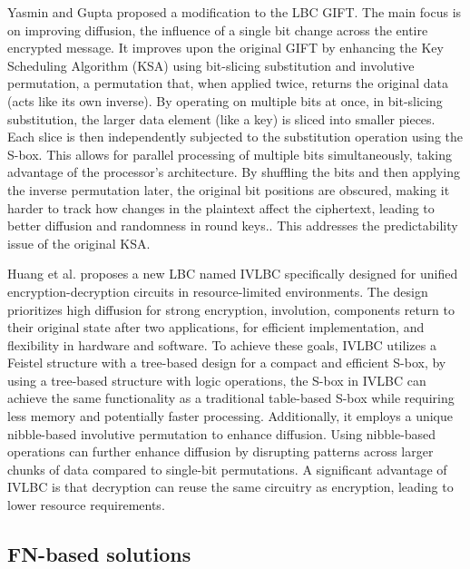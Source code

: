 \documentclass[conference]{IEEEtran}
\begin{document}
Yasmin and Gupta proposed a modification to the LBC GIFT. The main focus is on improving diffusion, the influence of a single bit change across the entire encrypted message. It improves upon the original GIFT by enhancing the Key Scheduling Algorithm (KSA) using bit-slicing substitution and involutive permutation, a permutation that, when applied twice, returns the original data (acts like its own inverse). By operating on multiple bits at once, in bit-slicing substitution, the larger data element (like a key) is sliced into smaller pieces. Each slice is then independently subjected to the substitution operation using the S-box. This allows for parallel processing of multiple bits simultaneously, taking advantage of the processor's architecture. By shuffling the bits and then applying the inverse permutation later, the original bit positions are obscured, making it harder to track how changes in the plaintext affect the ciphertext, leading to better diffusion and randomness in round keys.. This addresses the predictability issue of the original KSA.\cite{GIFT}\cite{yasmin2023modified}

Huang et al. proposes a new LBC named IVLBC specifically designed for unified encryption-decryption circuits in resource-limited environments. The design prioritizes high diffusion for strong encryption, involution, components return to their original state after two applications, for efficient implementation, and flexibility in hardware and software. To achieve these goals, IVLBC utilizes a Feistel structure with a tree-based design for a compact and efficient S-box, by using a tree-based structure with logic operations, the S-box in IVLBC can achieve the same functionality as a traditional table-based S-box while requiring less memory and potentially faster processing. Additionally, it employs a unique nibble-based involutive permutation to enhance diffusion. Using nibble-based operations can further enhance diffusion by disrupting patterns across larger chunks of data compared to single-bit permutations. A significant advantage of IVLBC is that decryption can reuse the same circuitry as encryption, leading to lower resource requirements.\cite{IVLBC}

\subsection{FN-based solutions}
\end{document}
